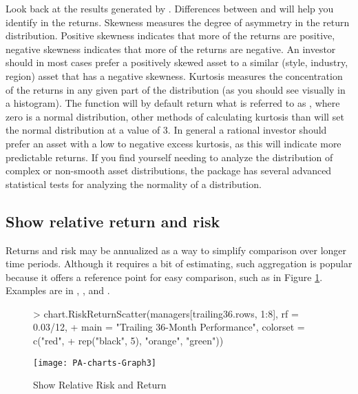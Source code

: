 \documentclass[12pt,letterpaper,english]{article}
\begin{document}
Look back at the results generated by .
Differences between  and 
will help you identify  in
the returns. Skewness measures the degree of asymmetry in the return
distribution. Positive skewness indicates that more of the returns
are positive, negative skewness indicates that more of the returns
are negative. An investor should in most cases prefer a positively
skewed asset to a similar (style, industry, region) asset that has
a negative skewness. Kurtosis measures the concentration of the returns
in any given part of the distribution (as you should see visually
in a histogram). The  function
will by default return what is referred to as ,
where zero is a normal distribution, other methods of calculating
kurtosis than  will set
the normal distribution at a value of 3. In general a rational investor
should prefer an asset with a low to negative excess kurtosis, as
this will indicate more predictable returns. If you find yourself
needing to analyze the distribution of complex or non-smooth asset
distributions, the  package has several advanced
statistical tests for analyzing the normality of a distribution.




\subsection{Show relative return and risk}

Returns and risk may be annualized as a way to simplify comparison
over longer time periods. Although it requires a bit of estimating,
such aggregation is popular because it offers a reference point for
easy comparison, such as in Figure \ref{fig:Show-Relative-Risk}.
Examples are in , ,
and .

%
\begin{figure}

\caption{Show Relative Risk and Return}

\label{fig:Show-Relative-Risk}

\begin{center}

\begin{Schunk}
\begin{Sinput}
> chart.RiskReturnScatter(managers[trailing36.rows, 1:8], rf = 0.03/12, 
+     main = "Trailing 36-Month Performance", colorset = c("red", 
+         rep("black", 5), "orange", "green"))
\end{Sinput}
\end{Schunk}
\texttt{[image: PA-charts-Graph3]}

\end{center}
\end{figure}
\end{document}
